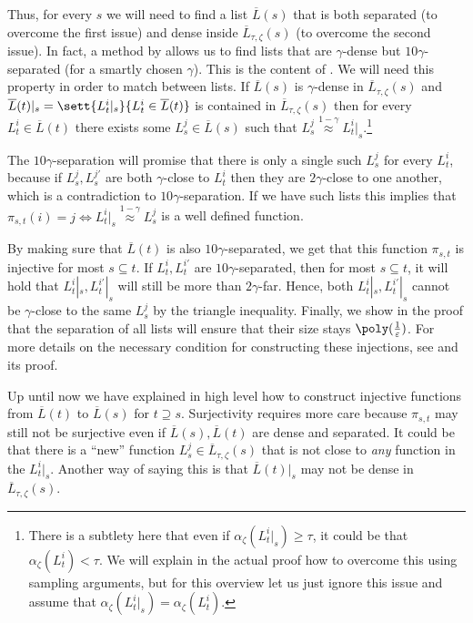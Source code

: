 Thus, for every \(s\) we will need to find a list \(\overline{L}(s)\) that is both separated (to overcome the first issue) and dense inside \(\overline{L}_{\tau,\zeta}(s)\) (to overcome the second issue). In fact, a method by \cite{DinurHKLT2018} allows us to find lists that are \(\gamma\)-dense but \(10\gamma\)-separated (for a smartly chosen \(\gamma\)). This is the content of . We will need this property in order to match between lists. If \(\overline{L}(s)\) is \(\gamma\)-dense in \(\overline{L}_{\tau,\zeta}(s)\) and \(\overline{L}(t)|_s = \sett{L_t^i|_s}{L_t^i \in \overline{L}(t)}\) is contained in \(\overline{L}_{\tau,\zeta}(s)\) then for every \(L_t^i \in \overline{L}(t)\) there exists some \(L_s^j \in \overline{L}(s)\) such that \(L_s^j \overset{1-\gamma}{\approx} L_t^i|_s\).\footnote{There is a subtlety here that even if \(\alpha_{\zeta}(L_t^i|_s) \geq \tau\), it could be that \(\alpha_{\zeta}(L_t^i) < \tau\). We will explain in the actual proof how to overcome this using sampling arguments, but for this overview let us just ignore this issue and assume that \(\alpha_{\zeta}(L_t^i|_s) = \alpha_{\zeta}(L_t^i)\).} %

%
The \(10\gamma\)-separation will promise that there is only a single such \(L_s^j\) for every \(L_t^i\), because if \(L_s^{j},L_s^{j'}\) are both \(\gamma\)-close to \(L_t^i\) then they are \(2\gamma\)-close to one another, which is a contradiction to \(10\gamma\)-separation. If we have such lists this implies that \(\pi_{s,t}(i)=j \Leftrightarrow L_t^i|_s \overset{1-\gamma}{\approx} L_s^j\) is a well defined function.

By making sure that \(\overline{L}(t)\) is also \(10\gamma\)-separated, we get that this function \(\pi_{s,t}\) is injective for most \(s \subseteq t\). If \(L_t^i,L_t^{i'}\) are \(10\gamma\)-separated, then for most \(s \subseteq t\), it will hold that \(L_t^i|_s, L_t^{i'}|_s\) will still be more than \(2\gamma\)-far. Hence, both \(L_t^i|_s, L_t^{i'}|_s\) cannot be \(\gamma\)-close to the same \(L_s^j\) by the triangle inequality. Finally, we show in the proof that the separation of all lists will ensure that their size stays \(\poly(\frac{1}{\varepsilon})\). For more details on the necessary condition for constructing these injections, see  and its proof.

\medskip
Up until now we have explained in high level how to construct injective functions from \(\overline{L}(t)\) to \(\overline{L}(s)\) for \(t \supseteq s\). Surjectivity requires more care because \(\pi_{s,t}\) may still not be surjective even if \(\overline{L}(s),\overline{L}(t)\) are dense and separated. It could be that there is a ``new'' function \(L_s^j \in \overline{L}_{\tau,\zeta}(s)\) that is not close to \emph{any} function in the \(L_t^i|_s\). Another way of saying this is that \(\overline{L}(t)|_s\) may not be dense in \(\overline{L}_{\tau,\zeta}(s)\). %

